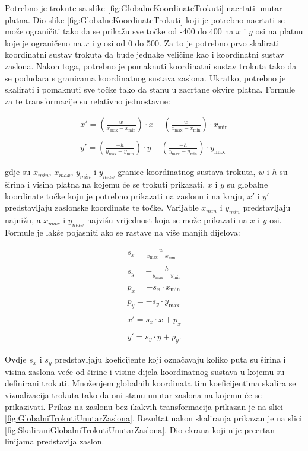 \documentclass{foi}
\begin{document}
Potrebno je trokute sa slike \ref{fig:GlobalneKoordinateTrokuti} nacrtati unutar platna. Dio slike \ref{fig:GlobalneKoordinateTrokuti} koji je potrebno nacrtati se može ograničiti tako da se prikažu sve točke od -400 do 400 na $x$ i $y$ osi na platnu koje je ograničeno na $x$ i $y$ osi od 0 do 500. Za to je potrebno prvo skalirati koordinatni sustav trokuta da bude jednake veličine kao i koordinatni sustav zaslona. Nakon toga, potrebno je pomaknuti koordinatni sustav trokuta tako da se podudara s granicama koordinatnog sustava zaslona. Ukratko, potrebno je skalirati i pomaknuti sve točke tako da stanu u zacrtane okvire platna. Formule za te transformacije su relativno jednostavne:

\begin{align*}
x' = \left(\frac{w}{x_{\max} - x_{\min}}\right) \cdot x - \left(\frac{w}{x_{\max} - x_{\min}}\right) \cdot x_{\min}
\\
\\
y' = \left(\frac{-h}{y_{\max} - y_{\min}}\right) \cdot y - \left(\frac{-h}{y_{\max} - y_{\min}}\right) \cdot y_{\max}
\end{align*}

 gdje su $x_{min}$, $x_{max}$, $y_{min}$ i $y_{max}$  granice koordinatnog sustava trokuta, $w$ i $h$ su širina i visina platna na kojemu će se trokuti prikazati, $x$ i $y$ su globalne koordinate točke koju je potrebno prikazati na zaslonu i na kraju, $x'$ i $y'$ predstavljaju zaslonske koordinate te točke. Varijable $x_{min}$ i $y_{min}$ predstavljaju najnižu, a $x_{max}$ i $y_{max}$ najvišu vrijednost koja se može prikazati na $x$ i $y$ osi. Formule je lakše pojasniti ako se rastave na više manjih dijelova:

\begin{align*}
s_x = \frac{w}{x_{\max} - x_{\min}}
\\
\\
s_y = -\frac{h}{y_{\max} - y_{\min}}
\\
\\
p_x = -s_x \cdot x_{\min}
\\
\\
p_y = -s_y \cdot y_{\max}
\\
\\
x' = s_x \cdot x + p_x
\\
\\
y' = s_y \cdot y + p_y.
\end{align*}

Ovdje $s_x$ i $s_y$ predstavljaju koeficijente koji označavaju koliko puta su širina i visina zaslona veće od širine i visine dijela koordinatnog sustava u kojemu su definirani trokuti. Množenjem globalnih koordinata tim koeficijentima skalira se vizualizacija trokuta tako da oni stanu unutar zaslona na kojemu će se prikazivati. Prikaz na zaslonu  bez ikakvih transformacija prikazan je na slici \ref{fig:GlobalniTrokutiUnutarZaslona}. Rezultat nakon skaliranja prikazan je na slici \ref{fig:SkaliraniGlobalniTrokutiUnutarZaslona}. Dio ekrana koji nije precrtan linijama predstavlja zaslon.
\end{document}
